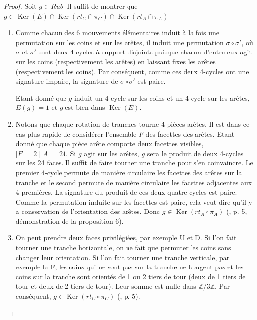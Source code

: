 \documentclass[french]{report}
\begin{document}
  \begin{proof}


    Soit $g \in Rub$. Il suffit de montrer que $g \in  \operatorname{Ker}(E ) \cap \operatorname{Ker}(rt_C \cap \pi_C) \cap \operatorname{Ker}(rt_A \cap \pi_A)$
    \begin{enumerate}
      \item Comme chacun des 6 mouvements élémentaires induit à la fois une permutation sur les coins et sur les arêtes, il induit une permutation $\sigma \circ \sigma'$, où $\sigma$ et $\sigma'$ sont deux 4-cycles à support disjoints puisque chacun d'entre eux agit sur les coins (respectivement les arêtes) en laissant fixes les arêtes (respectivement les coins). Par conséquent, comme ces deux 4-cycles ont une signature impaire, la signature de $\sigma \circ \sigma'$ est paire.

      Etant donné que $g$ induit un 4-cycle sur les coins et un 4-cycle sur les arêtes, $E (g) =1$ et $g$ est bien dans $\operatorname{Ker}(E )$.

      \item Notons que chaque rotation de tranches tourne 4 pièces arêtes. Il est dans ce cas plus rapide de considérer l'ensemble $F$ des facettes des arêtes. Etant donné que chaque pièce arête comporte deux facettes visibles, $\mid F \mid = 2 \mid A \mid = 24$. Si $g$ agit sur les arêtes, $g$ sera le produit de deux 4-cycles sur les 24 faces. Il suffit de faire tourner une tranche pour s'en coinvaincre. Le premier 4-cycle permute de manière circulaire les facettes des arêtes sur la tranche et le second permute de manière circulaire les facettes adjacentes aux 4 premières. La signature du produit de ces deux quatre cycles est paire. Comme la permutation induite sur les facettes est paire, cela veut dire qu'il y a conservation de l'orientation des arêtes. Donc $g \in \operatorname{Ker}(rt_A \circ \pi_A)$ (\cite{colmez_rubik}, p. 5, démonstration de la proposition 6).

      \item On peut prendre deux faces privilégiées, par exemple U et D. Si l'on fait tourner une tranche horizontale, on ne fait que permuter les coins sans changer leur orientation. Si l'on fait tourner une tranche verticale, par exemple la F, les coins qui ne sont pas sur la tranche ne bougent pas et les coins sur la tranche sont orientés de 1 ou 2 tiers de tour (deux de 1 tiers de tour et deux de 2 tiers de tour). Leur somme est nulle dans $\mathbb{Z}/{ 3 }\mathbb{Z}$. Par conséquent, $g \in \operatorname{Ker}(rt_C \circ \pi_C)$ (\cite{colmez_rubik}, p. 5).




\end{enumerate}
\end{proof}
\end{document}
